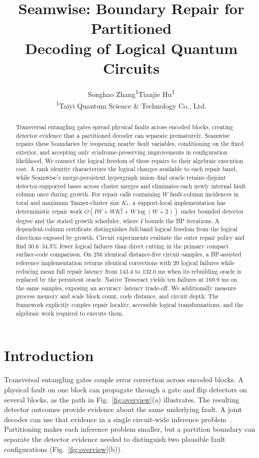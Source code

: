 \documentclass[10pt,letterpaper,twocolumn]{article}
\title{\vspace{-1.5em}Seamwise: Boundary Repair for Partitioned\\Decoding of Logical Quantum Circuits}
\author{Songhao Zhang\textsuperscript{1}\qquad Tianjie Hu\textsuperscript{1}\\[3pt]\small\textsuperscript{1}Taiyi Quantum Science \& Technology Co., Ltd.}
\date{}
\begin{document}
\maketitle
\begin{abstract}
Transversal entangling gates spread physical faults across encoded blocks, creating detector evidence that a partitioned decoder can separate prematurely. Seamwise repairs these boundaries by reopening nearby fault variables, conditioning on the fixed exterior, and accepting only syndrome-preserving improvements in configuration likelihood. We connect the logical freedom of these repairs to their algebraic execution cost. A rank identity characterizes the logical changes available to each repair band, while Seamwise's merge-persistent hypergraph union--find oracle retains disjoint detector-supported bases across cluster merges and eliminates each newly internal fault column once during growth. For repair calls containing $W$ fault-column incidences in total and maximum Tanner-cluster size $K_*$, a support-local implementation has deterministic repair work $O(IW+WK_*^2+W\log(W+2))$ under bounded detector degree and the stated growth scheduler, where $I$ bounds the BP iterations. A dependent-column certificate distinguishes full-band logical freedom from the logical directions exposed by growth. Circuit experiments evaluate the outer repair policy and find 30.6--34.5\% fewer logical failures than direct cutting in the primary compact surface-code comparison. On 256 identical distance-five circuit samples, a BP-assisted reference implementation returns identical corrections with 29 logical failures while reducing mean full repair latency from 143.4 to 132.0 ms when its rebuilding oracle is replaced by the persistent oracle. Native Tesseract yields ten failures at 169.9 ms on the same samples, exposing an accuracy--latency trade-off. We additionally measure process memory and scale block count, code distance, and circuit depth. The framework explicitly couples repair locality, accessible logical transformations, and the algebraic work required to execute them.
\end{abstract}

\section{Introduction}
Transversal entangling gates couple error correction across encoded blocks. A physical fault on one block can propagate through a gate and flip detectors on several blocks, as the path in Fig.~\ref{fig:overview}(a) illustrates. The resulting detector outcomes provide evidence about the same underlying fault. A joint decoder can use that evidence in a single circuit-wide inference problem~\cite{cain}. Partitioning makes each inference problem smaller, but a partition boundary can separate the detector evidence needed to distinguish two plausible fault configurations (Fig.~\ref{fig:overview}(b)).
\end{document}
